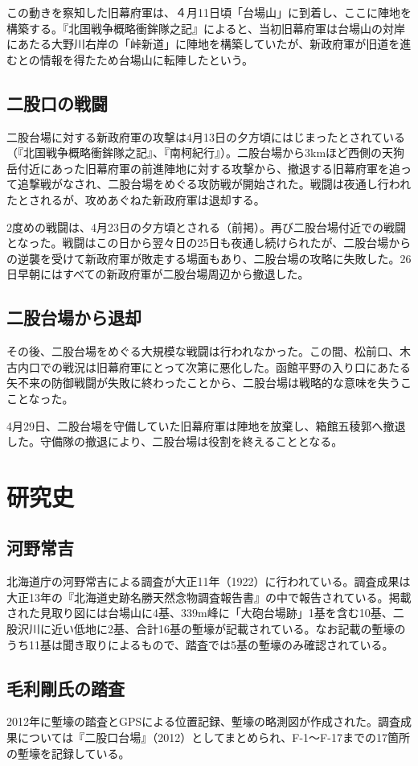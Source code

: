 \documentclass[14Q]{jsarticle}
\begin{document}
この動きを察知した旧幕府軍は、４月11日頃「台場山」に到着し、ここに陣地を構築する。『北国戦争概略衝鉾隊之記』によると、当初旧幕府軍は台場山の対岸にあたる大野川右岸の「峠新道」に陣地を構築していたが、新政府軍が旧道を進むとの情報を得たため台場山に転陣したという。

\subsection{二股口の戦闘}
二股台場に対する新政府軍の攻撃は4月13日の夕方頃にはじまったとされている（『北国戦争概略衝鉾隊之記』、『南柯紀行』）。二股台場から3kmほど西側の天狗岳付近にあった旧幕府軍の前進陣地に対する攻撃から、撤退する旧幕府軍を追って追撃戦がなされ、二股台場をめぐる攻防戦が開始された。戦闘は夜通し行われたとされるが、攻めあぐねた新政府軍は退却する。

2度めの戦闘は、4月23日の夕方頃とされる（前掲）。再び二股台場付近での戦闘となった。戦闘はこの日から翌々日の25日も夜通し続けられたが、二股台場からの逆襲を受けて新政府軍が敗走する場面もあり、二股台場の攻略に失敗した。26日早朝にはすべての新政府軍が二股台場周辺から撤退した。

\subsection{二股台場から退却}
その後、二股台場をめぐる大規模な戦闘は行われなかった。この間、松前口、木古内口での戦況は旧幕府軍にとって次第に悪化した。函館平野の入り口にあたる矢不来の防御戦闘が失敗に終わったことから、二股台場は戦略的な意味を失うこことなった。

4月29日、二股台場を守備していた旧幕府軍は陣地を放棄し、箱館五稜郭へ撤退した。守備隊の撤退により、二股台場は役割を終えることとなる。

\section{研究史}
\subsection{河野常吉}
北海道庁の河野常吉による調査が大正11年（1922）に行われている。調査成果は大正13年の『北海道史跡名勝天然念物調査報告書』の中で報告されている。掲載された見取り図には台場山に4基、339m峰に「大砲台場跡」1基を含む10基、二股沢川に近い低地に2基、合計16基の塹壕が記載されている。なお記載の塹壕のうち11基は聞き取りによるもので、踏査では5基の塹壕のみ確認されている。


\subsection{毛利剛氏の踏査}
2012年に塹壕の踏査とGPSによる位置記録、塹壕の略測図が作成された。調査成果については『二股口台場』（2012）としてまとめられ、F-1〜F-17までの17箇所の塹壕を記録している。
\end{document}
